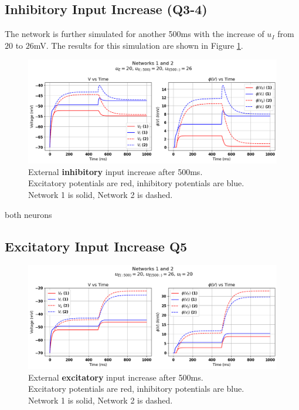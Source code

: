 \documentclass[10pt,twocolumn]{article}
\begin{document}
\subsection{Inhibitory Input Increase (Q3-4)}
The network is further simulated for another 500ms with
the increase of $u_I$ from $20$ to $26$mV. The results for
this simulation are shown in Figure \ref{fig:i-input}.

\begin{figure}
    \centering
    \captionsetup{justification=centering}
    \includegraphics[width=1\textwidth]{images/12-I_input.png}
    \caption{External \textbf{inhibitory} input increase after 500ms.\\
        Excitatory potentials are red, inhibitory potentials are blue.\\
        Network 1 is solid, Network 2 is dashed.}
    \label{fig:i-input}
\end{figure}

both neurons

\subsection{Excitatory Input Increase Q5}

\begin{figure}
    \centering
    \captionsetup{justification=centering}
    \includegraphics[width=1\textwidth]{images/12-E_input.png}
    \caption{External \textbf{excitatory} input increase after 500ms. \\
        Excitatory potentials are red, inhibitory potentials are blue.\\
        Network 1 is solid, Network 2 is dashed.}
    \label{fig:e-input}
\end{figure}
\end{document}
